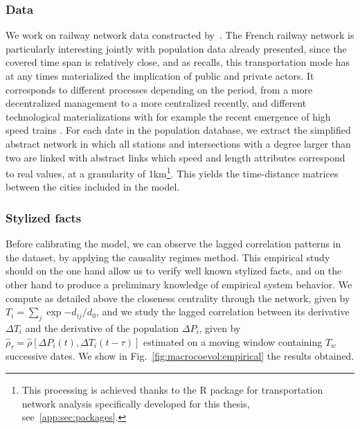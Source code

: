 \subsubsection{Data}

We work on railway network data constructed by~\cite{thevenin2013mapping}. The French railway network is particularly interesting jointly with population data already presented, since the covered time span is relatively close, and as \cite{thevenin2013mapping} recalls, this transportation mode has at any times materialized the implication of public and private actors. It corresponds to different processes depending on the period, from a more decentralized management to a more centralized recently, and different technological materializations with for example the recent emergence of high speed trains \cite{zembri1997fondements}. For each date in the population database, we extract the simplified abstract network in which all stations and intersections with a degree larger than two are linked with abstract links which speed and length attributes correspond to real values, at a granularity of 1km\footnote{This processing is achieved thanks to the R package for transportation network analysis specifically developed for this thesis, see~\ref{app:sec:packages}.}. This yields the time-distance matrices between the cities included in the model.



\subsubsection{Stylized facts}


Before calibrating the model, we can observe the lagged correlation patterns in the dataset, by applying the causality regimes method. This empirical study should on the one hand allow us to verify well known stylized facts, and on the other hand to produce a preliminary knowledge of empirical system behavior. We compute as detailed above the closeness centrality through the network, given by $T_i = \sum_j \exp{-d_{ij}/d_0}$, and we study the lagged correlation between its derivative $\Delta T_i$ and the derivative of the population $\Delta P_i$, given by $\hat{\rho}_{\tau} = \hat{\rho}\left[\Delta P_i(t),\Delta T_i(t-\tau)\right]$ estimated on a moving window containing $T_w$ successive dates. We show in Fig.~\ref{fig:macrocoevol:empirical} the results obtained.


